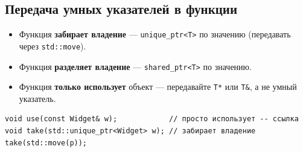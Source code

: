 \subsection{Передача умных указателей в функции}

\begin{itemize}[leftmargin=2em]
    \item Функция \textbf{забирает владение} --- \texttt{unique\_ptr<T>} по
          значению (передавать через \texttt{std::move}).
    \item Функция \textbf{разделяет владение} --- \texttt{shared\_ptr<T>} по
          значению.
    \item Функция \textbf{только использует} объект --- передавайте
          \texttt{T*} или \texttt{T\&}, а не умный указатель.
\end{itemize}

\begin{lstlisting}
void use(const Widget& w);            // просто использует -- ссылка
void take(std::unique_ptr<Widget> w); // забирает владение
take(std::move(p));
\end{lstlisting}
